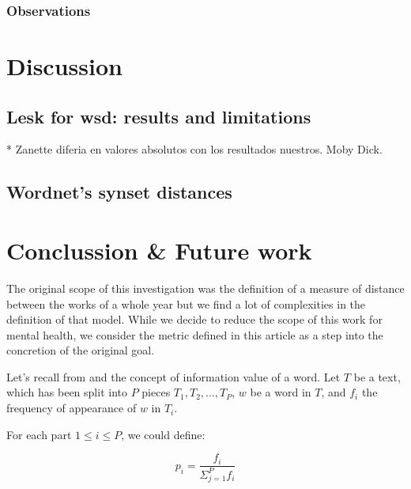 \documentclass{pnastwo}
\begin{document}
\begin{article}
\subsubsection{Observations}

\section{Discussion}


\subsection{Lesk for wsd: results and limitations}
* Zanette diferia en valores absolutos con los resultados nuestros. Moby Dick. 

\subsection{Wordnet's synset distances}

\section{Conclussion \& Future work}
The original scope of this investigation was the definition of a measure of distance between the works of a whole year but we find a lot of complexities in the definition of that model. While we decide to reduce the scope of this work for mental health, we consider the metric defined in this article as a step into the concretion of the original goal.







\label{appendix1}
Let's recall from \cite{DARWIN} and \cite{ENTROPIC} the concept of information value of a word.
Let $T$ be a text, which has been split into $P$ pieces $T_1, T_2, \dots, T_P$, $w$ be a word in $T$,
and $f_i$ the frequency of appearance of $w$ in $T_i$.

For each part $1 \leq i \leq P$, we could define:

\begin{equation}
  p_i = \frac{f_i}{\Sigma_{j=1}^{P}f_i}
\end{equation}


\end{article}
\end{document}

